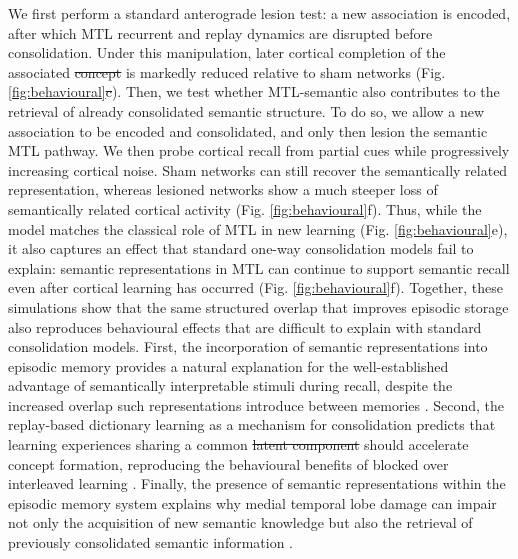 \documentclass{article}
\providecommand{\DIFaddtex}[1]{{\protect\color{blue}\uwave{#1}}} %
\providecommand{\DIFdeltex}[1]{{\protect\color{red}\sout{#1}}}                      %
\providecommand{\DIFaddbegin}{} %
\providecommand{\DIFaddend}{} %
\providecommand{\DIFdelbegin}{} %
\providecommand{\DIFdelend}{} %
\providecommand{\DIFadd}[1]{\texorpdfstring{\DIFaddtex{#1}}{#1}} %
\providecommand{\DIFdel}[1]{\texorpdfstring{\DIFdeltex{#1}}{}} %
\begin{document}
\newline\newline
We first perform a standard anterograde lesion test: a new association is encoded, after which MTL recurrent and replay dynamics are disrupted before consolidation. Under this manipulation, later cortical completion of the associated \DIFdelbegin \DIFdel{concept }\DIFdelend \DIFaddbegin \DIFadd{concepts }\DIFaddend is markedly reduced relative to sham networks (Fig. \ref{fig:behavioural}\DIFdelbegin \DIFdel{c}\DIFdelend \DIFaddbegin \DIFadd{e}\DIFaddend ). Then, we test whether MTL-semantic also contributes to the retrieval of already consolidated semantic structure. To do so, we allow a new association to be encoded and consolidated, and only then lesion the semantic MTL pathway. We then probe cortical recall from partial cues while progressively increasing cortical noise. Sham networks can still recover the semantically related representation, whereas lesioned networks show a much steeper loss of semantically related cortical activity (Fig. \ref{fig:behavioural}f). Thus, while the model matches the classical role of MTL in new learning (Fig. \ref{fig:behavioural}e), it also captures an effect that standard one-way consolidation models fail to explain: semantic representations in MTL can continue to support semantic recall even after cortical learning has occurred (Fig. \ref{fig:behavioural}f).
\newline\newline
Together, these simulations show that the same structured overlap that improves episodic storage also reproduces behavioural effects that are difficult to explain with standard consolidation models. First, the incorporation of semantic representations into episodic memory provides a natural explanation for the well-established advantage of semantically interpretable stimuli during recall, despite the increased overlap such representations introduce between memories \DIFdelbegin %
\DIFdelend \DIFaddbegin {}\DIFaddend . Second, the replay-based dictionary learning as a mechanism for consolidation predicts that learning experiences sharing a common \DIFdelbegin \DIFdel{latent component }\DIFdelend \DIFaddbegin \DIFadd{factor value }\DIFaddend should accelerate concept formation, reproducing the behavioural benefits of blocked over interleaved learning . Finally, the presence of semantic representations within the episodic memory system explains why medial temporal lobe damage can impair not only the acquisition of new semantic knowledge but also the retrieval of previously consolidated semantic information .
\end{document}
